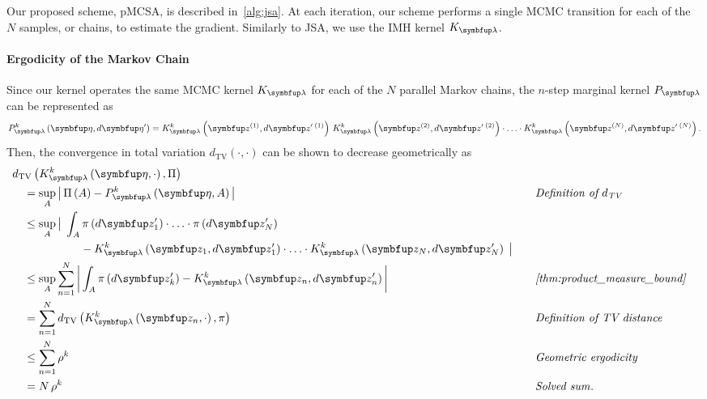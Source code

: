 \begin{proofEnd}

  Our proposed scheme, pMCSA, is described in~\cref{alg:jsa}. 
  At each iteration, our scheme performs a single MCMC transition for each of the \(N\) samples, or chains, to estimate the gradient.
  Similarly to JSA, we use the IMH kernel \(K_{\vlambda}\).

  \paragraph{Ergodicity of the Markov Chain}
  Since our kernel operates the same MCMC kernel \(K_{\vlambda}\) for each of the \(N\) parallel Markov chains, the \(n\)-step marginal kernel \(P_{\vlambda}\) can be represented as
  \begin{align*}
    P_{\vlambda}^k\left(\veta, d\veta^{\prime}\right)
    = 
    K_{\vlambda}^k\left(\vz^{(1)}, d\vz^{\prime\; (1)}\right)
    \,
    K_{\vlambda}^k\left(\vz^{(2)}, d\vz^{\prime\; (2)}\right)
    \cdot
    \ldots 
    \cdot
    K_{\vlambda}^k\left(\vz^{(N)}, d\vz^{\prime\; (N)}\right).
  \end{align*}
  Then, the convergence in total variation \(d_{\mathrm{TV}}\left(\cdot, \cdot\right)\) can be shown to decrease geometrically as
  \begin{alignat}{2}
    &\DTV{K^{k}_{\vlambda}\left(\veta, \cdot\right)}{\Pi}
    \nonumber
    \\
    &\quad=
    \sup_{A}
    \abs{
      \Pi\left(A\right)
      -
      P^{k}_{\vlambda}\left(\veta, A\right)
    }
    &&\quad\text{\textit{Definition of \(d_{\text{TV}}\)}}
    \nonumber
    \\
    &\quad\leq
    \sup_{A}
    \big|\;
    \int_{A}
      \pi\left(d\vz^{\prime}_1\right) \cdot \ldots \cdot \pi\left(d\vz^{\prime}_N\right)
    \nonumber
      \\
      &\qquad\qquad\qquad-
      K^k_{\vlambda}\left(\vz_1, d\vz^{\prime}_1\right) \cdot \ldots \cdot K^k_{\vlambda}\left(\vz_N, d\vz^{\prime}_N\right)
    \;\big|
    \nonumber
    \\
    &\quad\leq
    \sup_{A}
    \sum_{n=1}^N
    \abs{
    \int_{A}
      \pi\left(d\vz^{\prime}_k\right) - K^{k}_{\vlambda}\left(\vz_n, d\vz^{\prime}_n\right) 
    }
    &&\quad\text{\textit{\cref{thm:product_measure_bound}}}
    \nonumber
    \\
    &\quad=
    \sum_{n=1}^N
    \DTV{K^k_{\vlambda}\left(\vz_n, \cdot\right)}{\pi}
    &&\quad\text{\textit{Definition of TV distance}}
    \nonumber
    \\
    &\quad\leq
    \sum_{n=1}^N
    \rho^{k}
    &&\quad\text{\textit{Geometric ergodicity}}
    \nonumber
    \\
    &\quad=
    N\,\rho^{k}
    &&\quad\text{\textit{Solved sum}}.
    \nonumber
  \end{alignat}


\end{proofEnd}
